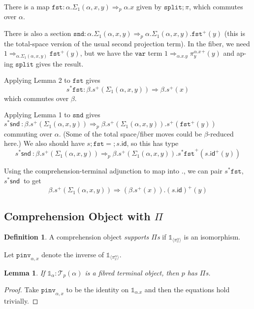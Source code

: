 \documentclass[10pt]{article}
\newtheorem{lemma}{Lemma}
\theoremstyle{definition}
\newtheorem{definition}{Definition}
\newcommand\dsd[1]{\ensuremath{\mathsf{#1}}}
\newcommand{\tcell}{\Rightarrow}
\newcommand{\app}[2]{\ensuremath{#1 \: #2}}
\newcommand{\snd}[1]{\app{\dsd{snd}}{#1}}
\newcommand{\id}{\mathsf{id}}
\newcommand\TrPlus[2]{\ensuremath{{#1}^+(#2)}}
\newcommand\El[2]{\mathcal{T}_{#1}(#2)}
\newcommand\One{\ensuremath{\mathds{1}}}
\newcommand\ApOne[1]{\ensuremath{\One_{\langle {#1} \rangle }}}
\newcommand\mtt[1]{\mathtt{#1}}
\newcommand\pinv[1]{\ensuremath{\mathtt{pinv}_{#1}}}
\begin{document}
\begin{enumerate}
  There is a map $\mtt{fst} : \alpha.\Sigma_1(\alpha,x,y) \tcell_p
  \alpha.x$ given by $\mtt{split};\pi$, which commutes over $\alpha$.

  There is also a section $\mtt{snd} : \alpha.\Sigma_1(\alpha,x,y)
  \tcell_p \alpha.\Sigma_1(\alpha,x,y).\TrPlus{\mtt{fst}}{y}$ (this is
  the total-space version of the usual second projection term).  In the
  fiber, we need $1 \tcell_{\alpha.\Sigma_1(\alpha,x,y)}
  \TrPlus{\mtt{fst}}{y}$, but we have the $\mtt{var}$ term $1
  \tcell_{\alpha.x.y} \TrPlus{\pi^{\alpha.x}_y}{y}$ and ap-ing
  $\mtt{split}$ gives the result.
  
  Applying Lemma 2 to $\mtt{fst}$ gives
  \[s^*{\mtt{fst}} : \beta.\TrPlus{s}{\Sigma_1(\alpha,x,y)} \tcell \beta.\TrPlus{s}{x}
  \]
  which commutes over $\beta$.

  Applying Lemma 1 to $\mtt{snd}$ gives $s^*{\snd{}} :
  \beta.\TrPlus{s}{\Sigma_1(\alpha,x,y)} \tcell_p
  \beta.\TrPlus{s}{\Sigma_1(\alpha,x,y)}.\TrPlus{s}{\TrPlus{\mtt{fst}}{y}}$
  commuting over $\alpha$.  (Some of the total space/fiber moves could
  be $\beta$-reduced here.)
  We also should have $s;\mtt{fst} = ;{s.\id}$, so this has type
  \[
  s^*{\snd{}} : \beta.\TrPlus{s}{\Sigma_1(\alpha,x,y)} \tcell_p
  \beta.\TrPlus{s}{\Sigma_1(\alpha,x,y)}.\TrPlus{s^*\mtt{fst}}{\TrPlus{s.\id}{y}}
  \]
  
  Using the comprehension-terminal adjunction to map into $.$, we can
  pair $s^*{\mtt{fst}}$, $s^*{\snd{}}$
  to get
  \[
  \beta.\TrPlus{s}{\Sigma_1(\alpha,x,y)} \tcell (\beta.\TrPlus{s}{x}).{\TrPlus{(s.\id)}{y}}
  \]
  
\end{enumerate}
\fi

\subsection{Comprehension Object with $\Pi$}

\begin{definition}\label{def:supports-pis}
A comprehension object \emph{supports $\Pi$s} if $\ApOne{\pi^\alpha_x}$ is an isomorphism.
\end{definition}

Let $\pinv{\alpha,x}$ denote the inverse of $\ApOne{\pi^\alpha_x}$.

\begin{lemma}
If $\One_\alpha : \El{p}{\alpha}$ is a fibred terminal object, then $p$ has $\Pi$s.
\end{lemma}
\begin{proof}
Take $\pinv{\alpha,x}$ to be the identity on $\One_{\alpha.x}$ and then the equations hold trivially.
\end{proof}
\end{document}

